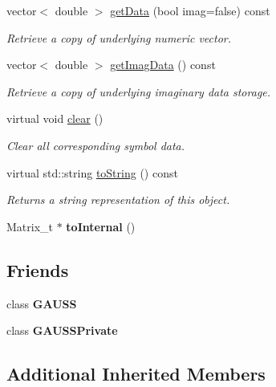 \begin{DoxyCompactItemize}
vector$<$ double $>$ \hyperlink{class_g_e_matrix_a49482e136fe25e61e8afc3eb2355146b}{get\+Data} (bool imag=false) const
\begin{DoxyCompactList}\small\item\em Retrieve a copy of underlying numeric vector. \end{DoxyCompactList}\item 
vector$<$ double $>$ \hyperlink{class_g_e_matrix_a7610a3e67e0729c3a1d4ae5648d2aae5}{get\+Imag\+Data} () const
\begin{DoxyCompactList}\small\item\em Retrieve a copy of underlying imaginary data storage. \end{DoxyCompactList}\item 
virtual void \hyperlink{class_g_e_matrix_a1bf6ddd9f46248e1c03c0d952d572103}{clear} ()
\begin{DoxyCompactList}\small\item\em Clear all corresponding symbol data. \end{DoxyCompactList}\item 
virtual std\+::string \hyperlink{class_g_e_matrix_a698481e17b01b981ce483ebab3058d0b}{to\+String} () const
\begin{DoxyCompactList}\small\item\em Returns a string representation of this object. \end{DoxyCompactList}\item 
\mbox{\label{class_g_e_matrix_a9e74328752b5303f86f2bb41cf5f6534}} 
Matrix\+\_\+t $\ast$ {\bfseries to\+Internal} ()
\end{DoxyCompactItemize}
\subsection*{Friends}
\begin{DoxyCompactItemize}
\item 
\mbox{\label{class_g_e_matrix_abc89e64d0ec6c939575c3125753c6309}} 
class {\bfseries G\+A\+U\+SS}
\item 
\mbox{\label{class_g_e_matrix_a2e5e14117f0e69078f45b8d512f056de}} 
class {\bfseries G\+A\+U\+S\+S\+Private}
\end{DoxyCompactItemize}
\subsection*{Additional Inherited Members}


